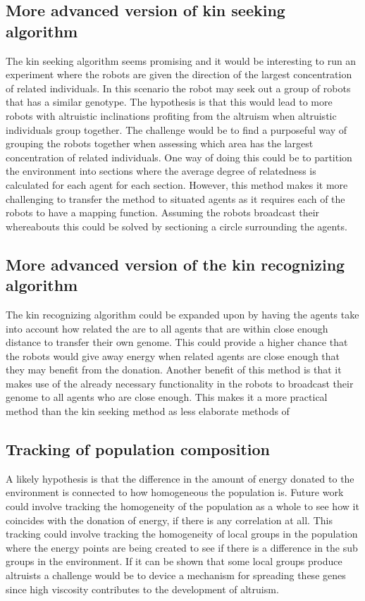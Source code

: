 \documentclass[a4paper]{book}
\begin{document}
\subsection{More advanced version of kin seeking algorithm}
The kin seeking algorithm seems promising and it would be interesting to run an experiment where the robots are given the direction of the largest concentration of related individuals.
In this scenario the robot may seek out a group of robots that has a similar genotype. 
The hypothesis is that this would lead to more robots with altruistic inclinations profiting from the altruism when altruistic individuals group together. 
The challenge would be to find a purposeful way of grouping the robots together when assessing which area has the largest concentration of related individuals. 
One way of doing this could be to partition the environment into sections where the average degree of relatedness is calculated for each agent for each section. 
However, this method makes it more challenging to transfer the method to situated agents as it requires each of the robots to have a mapping function. 
Assuming the robots broadcast their whereabouts this could be solved by sectioning a circle surrounding the agents.

\subsection{More advanced version of the kin recognizing algorithm}
The kin recognizing algorithm could be expanded upon by having the agents take into account how related the are to all agents that are within close enough distance to transfer their own genome. 
This could provide a higher chance that the robots would give away energy when related agents are close enough that they may benefit from the donation.
Another benefit of this method is that it makes use of the already necessary functionality in the robots to broadcast their genome to all agents who are close enough.
This makes it a more practical method than the kin seeking method as less elaborate methods of 

\subsection{Tracking of population composition}
A likely hypothesis is that the difference in the amount of energy donated to the environment is connected to how homogeneous the population is.
Future work could involve tracking the homogeneity of the population as a whole to see how it coincides with the donation of energy, if there is any correlation at all.
This tracking could involve tracking the homogeneity of local groups in the population where the energy points are being created to see if there is a difference in the sub groups in the environment.
If it can be shown that some local groups produce altruists a challenge would be to device a mechanism for spreading these genes since high viscosity contributes to the development of altruism.
\end{document}
